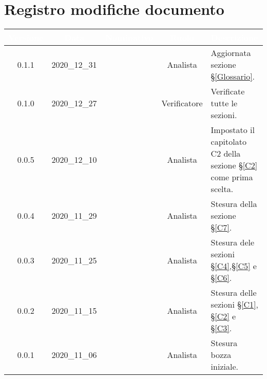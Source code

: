 \section*{Registro modifiche documento}
{
\renewcommand{\arraystretch}{1.5}
\centering
\begin{longtable}{c c C{2.3cm} c C{3cm}}


 \textcolor{white}{\textbf{Versione}} &
    \textcolor{white}{\textbf{Data}} &
    \textcolor{white}{\textbf{Nominativo}} &
    \textcolor{white}{\textbf{Ruolo}} &
    \textcolor{white}{\textbf{Descrizione}}\\	
    \endhead
    
    0.1.1 & 2020\_12\_31 & \TG{} & Analista & Aggiornata sezione \S\ref{Glossario}. \\
    
     0.1.0 & 2020\_12\_27 & \TG{} & Verificatore & Verificate tutte le sezioni. \\
    
    0.0.5 & 2020\_12\_10 & \FF{} & Analista & Impostato il capitolato C2 della sezione \S\ref{C2} come prima scelta.  \\

    0.0.4 & 2020\_11\_29 & \FF{} & Analista & Stesura della sezione \S\ref{C7}.  \\
    
    0.0.3 & 2020\_11\_25 & \FF{} & Analista & Stesura dele sezioni \S\ref{C4},\S \ref{C5} e \S\ref{C6}.  \\
    
    0.0.2 & 2020\_11\_15 & \FF{} & Analista & Stesura delle sezioni \S\ref{C1}, \S\ref{C2} e \S\ref{C3}.  \\
            
    0.0.1 & 2020\_11\_06 & \FF{} & Analista & Stesura bozza iniziale.  \\
			
\end{longtable}
}